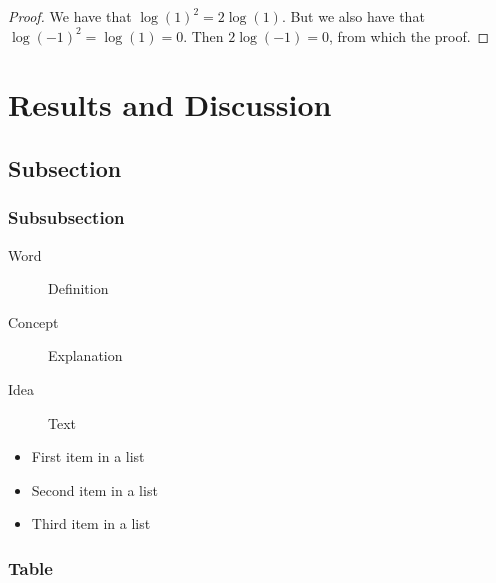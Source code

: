 \documentclass[
10pt, %
a4paper, %
oneside, %
headinclude,footinclude, %
BCOR5mm, %
]{scrartcl}
\begin{document}
\begin{proof}
We have that $\log(1)^2 = 2\log(1)$.
But we also have that $\log(-1)^2=\log(1)=0$.
Then $2\log(-1)=0$, from which the proof.
\end{proof}


\section{Results and Discussion}

\lipsum[10] %


\subsection{Subsection}

\lipsum[11] %

\subsubsection{Subsubsection}
\cite{Figueredo:2009dg}
\lipsum[12] %

\begin{description}
\item[Word] Definition
\item[Concept] Explanation
\item[Idea] Text
\end{description}

\lipsum[12] %

\begin{itemize}[noitemsep] %
\item First item in a list
\item Second item in a list
\item Third item in a list
\end{itemize}

\subsubsection{Table}

\lipsum[13] %
\end{document}
